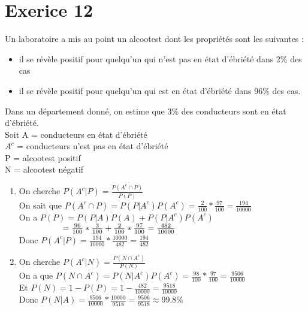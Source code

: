 \documentclass{article}
\author{Frederic Becerril}
\newcommand\tab[1][1cm]{\hspace*{#1}}
\begin{document}
\part*{Exerice 12}

Un laboratoire a mis au point un alcootest dont les propriétés sont les suivantes :
\begin{itemize}
    \item il se révèle positif pour quelqu'un qui n'est pas en état d'ébriété dans 2\% des cas
    \item il se révèle positif pour quelqu'un qui est en état d'ébriété dans 96\% des cas.
\end{itemize}
Dans un département donné, on estime que 3\% des conducteurs sont en état d'ébriété.\\
Soit A = conducteurs en état d'ébriété\\
$A^c$ = conducteurs n'est pas en état d'ébriété\\
P = alcootest positif\\
N = alcootest négatif
\begin{enumerate}
    \item On cherche $P(A^c|P) = \frac{P(A^c \cap P)}{P(P)}$\\
    On sait que $P(A^c \cap P) = P(P|A^c)P(A^c) = \frac{2}{100} * \frac{97}{100} = \frac{194}{10000}$\\
    On a $P(P) = P(P|A)P(A) + P(P|A^c)P(A^c)$\\
    $\tab[1.8cm] = \frac{96}{100} * \frac{3}{100} + \frac{2}{100} * \frac{97}{100} = \frac{482}{10000}$\\
    Donc $P(A^c|P) = \frac{194}{10000} * \frac{10000}{482} = \frac{194}{482}$
    \item On cherche $P(A^c|N) =  \frac{P(N \cap A^c)}{P(N)}$\\
    On a que $P(N \cap A^c) = P(N|A^c) P(A^c) = \frac{98}{100} * \frac{97}{100} = \frac{9506}{10000}$\\
    Et $P(N) = 1 - P(P) = 1 - \frac{482}{10000} = \frac{9518}{10000}$\\ 
    Donc $P(N | A) = \frac{9506}{10000} * \frac{10000}{9518} = \frac{9506}{9518} \approx 99.8\%$

\end{enumerate}
\end{document}

